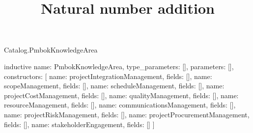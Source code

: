 \begin{lexlean}{Catalog.PmbokKnowledgeArea}
\title{Natural number addition}
\begin{semanticmodule}
inductive{
  name: PmbokKnowledgeArea,
  type_parameters: [],
  parameters: [],
  constructors: [
    {name: projectIntegrationManagement, fields: []},
    {name: scopeManagement, fields: []},
    {name: scheduleManagement, fields: []},
    {name: projectCostManagement, fields: []},
    {name: qualityManagement, fields: []},
    {name: resourceManagement, fields: []},
    {name: communicationsManagement, fields: []},
    {name: projectRiskManagement, fields: []},
    {name: projectProcurementManagement, fields: []},
    {name: stakeholderEngagement, fields: []}
  ]
}
\end{semanticmodule}
\end{lexlean}
